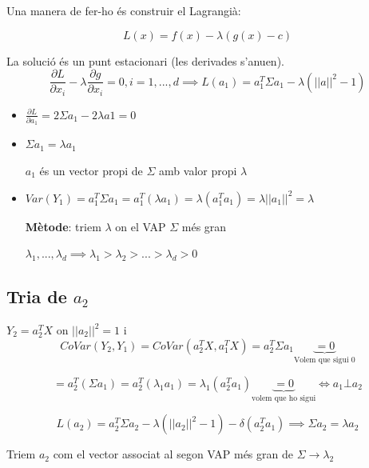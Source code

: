 \documentclass[a4paper]{article}
\begin{document}
	Una manera de fer-ho és construir el Lagrangià:
	
	$$  L(x) = f(x) - \lambda(g(x) - c)  $$
	
	La solució és un punt estacionari (les derivades s'anu\lgem en).
	$$  \frac{\partial L}{\partial x_i} - \lambda \frac{\partial g}{\partial x_i} = 0, i = 1, ..., d \implies L(a_1) = a_1^T\Sigma a_1 - \lambda(||a||^2 - 1)  $$
	
	\begin{itemize}
		\item $\frac{\partial L}{\partial a_1} = 2\Sigma a_1 - 2\lambda a1 = 0$
		\item $\Sigma a_1 = \lambda a_1$
		
		$a_1$ és un vector propi de $\Sigma$ amb valor propi $\lambda$
		\item $Var(Y_1) = a_1^T\Sigma a_1=a_1^T(\lambda a_1) = \lambda(a_1^T a_1) = \lambda ||a_1||^2 = \lambda$
		
		\textbf{Mètode}: triem $\lambda$ on el VAP $\Sigma$ més gran
		
		$\lambda_1, ..., \lambda_d \implies \lambda_1 > \lambda_2 > ... > \lambda_d > 0$
	\end{itemize}
	
	\subsection{Tria de $a_2$}
	
	$Y_2 = a_2^TX$ on $||a_2||^2 = 1$ i $$ CoVar(Y_2, Y_1) = CoVar(a_2^TX, a_1^TX) = a_2^T\Sigma a_1 \underbrace{= 0}_\text{Volem que sigui 0} $$ 
	
	$$  = a_2^T(\Sigma a_1) = a_2^T(\lambda_1 a_1) = \lambda_1 (a_2^Ta_1) \underbrace{= 0}_\text{volem que ho sigui} \Leftrightarrow a_1 \bot a_2  $$
	
	$$  L(a_2) = a_2^T\Sigma a_2 - \lambda(||a_2||^2 - 1) - \delta(a_2^Ta_1) \implies \Sigma a_2 = \lambda a_2  $$
	
	Triem $a_2$ com el vector associat al segon VAP més gran de $\Sigma \rightarrow \lambda_2$
	
\end{document}
